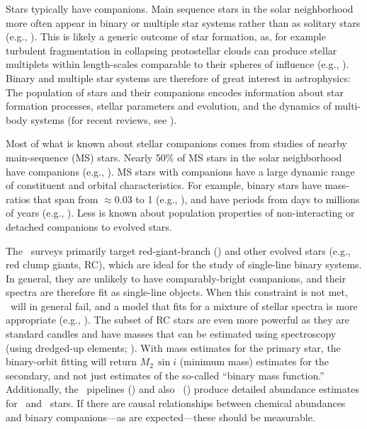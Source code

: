 \documentclass[modern, letterpaper]{aastex62}
\newcommand{\apogee}{\project{\acronym{APOGEE}}}
\newcommand{\thejoker}{\project{The~Joker}}
\newcommand{\thecannon}{\project{The~Cannon}}
\newcommand{\RC}{\acronym{RC}}
\newcommand{\RGB}{\acronym{RGB}}
\begin{document}
Stars typically have companions.
Main sequence stars in the solar neighborhood more often appear in binary or
multiple star systems rather than as solitary stars (e.g.,
\citealt{Duquennoy:1991,Raghavan:2010,Tokovinin:2014,Moe:2017}).
This is likely a generic outcome of star formation, as, for example turbulent
fragmentation in collapsing protostellar clouds can produce stellar multiplets
within length-scales comparable to their spheres of influence (e.g.,
\citealt{Raskutti:2016}).
Binary and multiple star systems are therefore of great interest in
astrophysics: The population of stars and their companions encodes information
about star formation processes, stellar parameters and evolution, and the
dynamics of multi-body systems (for recent reviews, see
\citealt{Duchene:2013,Moe:2017}).

Most of what is known about stellar companions comes from studies of
nearby main-sequence (MS) stars.
Nearly 50\% of MS stars in the solar neighborhood have companions
(e.g., \citealt{Tokovinin:2014}).
MS stars with companions have a large dynamic range of constituent and orbital
characteristics.
For example, binary stars have mass-ratios that span from $\approx 0.03$
to 1 (e.g., \citealt{Kraus:2008}), and have periods from days to
millions of years (e.g., \citealt{Raghavan:2010}).
Less is known about population properties of non-interacting or detached
companions to evolved stars.

The \apogee\ surveys primarily target red-giant-branch (\RGB) and other evolved
stars (e.g., red clump giants, RC), which are ideal for the study of single-line
binary systems.
In general, they are unlikely to have comparably-bright companions, and their
spectra are therefore fit as single-line objects.
When this constraint is not met, \thejoker\ will in general fail, and a model
that fits for a mixture of stellar spectra is more appropriate (e.g.,
\citealt{El-Badry:2018}).
The subset of RC stars are even more powerful as they are standard candles and
have masses that can be estimated using spectroscopy (using dredged-up elements;
\citealt{Martig:2016,Ness:2016}).
With mass estimates for the primary star, the binary-orbit fitting will return
$M_2\,\sin i$ (minimum mass) estimates for the secondary, and not just estimates
of the so-called ``binary mass function.''
Additionally, the \apogee\ pipelines (\citealt{Garcia-Perez:2016}) and also
\thecannon\ (\citealt{Ness:2015}) produce detailed abundance estimates for \RGB\
and \RC\ stars.
If there are causal relationships between chemical abundances and binary
companions---as are expected---these should be measurable.
\end{document}
